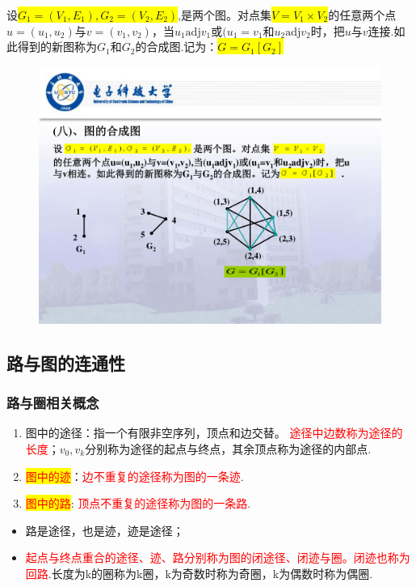 \begin{enumerate}
设\colorbox{yellow}{$G_1=(V_1,E_1),G_2=(V_2,E_2)$},是两个图。对点集\colorbox{yellow}{$V=V_1\times V_2$}的任意两个点$u=(u_1, u_2)$与$v=(v_1, v_2)$，当$u_1\mathrm{adj}v_1$或$(u_1=v_1\mbox{和}u_2\mathrm{adj}v_2$时，把$u$与$v$连接.如此得到的新图称为$G_1$和$G_2$的合成图.记为：\colorbox{yellow}{$G=G_1[G_2]$}
\begin{figure}[H]
	\small
	\centering 
	\includegraphics[scale=0.7]{image/CH1_hechengtu.pdf}  
	\label{figk1k}  
\end{figure}
\end{enumerate}


\subsection{路与图的连通性}
\subsubsection{路与圈相关概念}

\begin{enumerate}
\item 图中的途径：指一个有限非空序列，顶点和边交替。 \textcolor{red}{途径中边数称为途径的长度}；$v_0,v_k$分别称为途径的起点与终点，其余顶点称为途径的内部点.

\item \colorbox{yellow}{\textcolor{red}{图中的迹}}：\textcolor{red}{边不重复的途径称为图的一条迹}.
\item \colorbox{yellow}{\textcolor{red}{图中的路}}: \textcolor{red}{顶点不重复的途径称为图的一条路}.
\end{enumerate}
\begin{note}
	\begin{itemize}
		\item 路是途径，也是迹，迹是途径；
		\item \textcolor{red}{起点与终点重合的途径、迹、路分别称为图的闭途径、闭迹与圈。闭迹也称为回路}.长度为k的圈称为k圈，k为奇数时称为奇圈，k为偶数时称为偶圈.
	\end{itemize}
\end{note}

